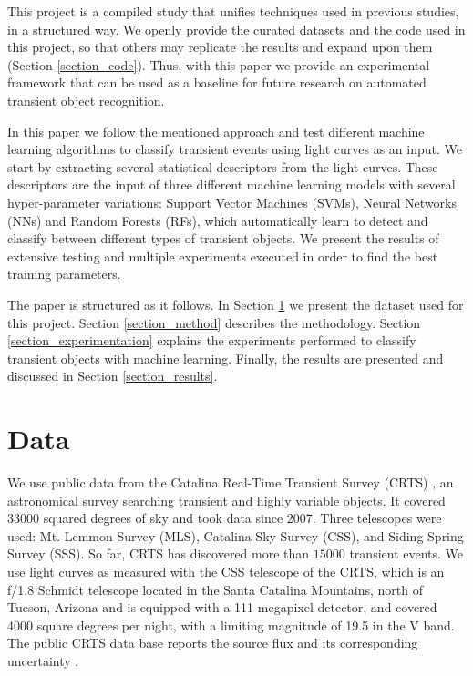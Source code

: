 \documentclass[a4paper,fleqn,usenatbib]{mnras}
\begin{document}
This project is a compiled study that unifies techniques used in previous studies, in a structured way. We openly provide the curated datasets and the code used in this project, so that others may replicate the results and expand upon them (Section \ref{section_code}). Thus, with this paper we provide an experimental framework that can be used as a baseline for future research on automated transient object recognition.

In this paper we follow the mentioned approach and test 
different machine
learning algorithms to classify transient events using light curves as an input.  
We start by extracting several statistical descriptors from the light
curves.
These descriptors are the input of three different machine learning
models with several hyper-parameter variations: Support Vector
Machines (SVMs), Neural Networks (NNs) and Random Forests (RFs), which automatically
learn to detect and classify between different types of transient
objects. 
We present the results of extensive testing and multiple experiments
executed in order to find the best training parameters. 



The paper is structured as it follows. In Section \ref{section_data}
we present the dataset used for this project. 
Section \ref{section_method} describes the methodology.
Section \ref{section_experimentation} explains the experiments
performed to classify transient objects with machine
learning. 
Finally, the results are presented and discussed in
Section \ref{section_results}.  

\section{Data} \label{section_data}

We use public data from the Catalina Real-Time Transient Survey
(CRTS) \citep{1111.2566}, an astronomical survey searching transient
and highly variable objects.   
It covered 33000 squared degrees of sky and took data since 2007.
Three telescopes were used: Mt. Lemmon Survey (MLS), Catalina Sky
Survey (CSS), and Siding Spring Survey (SSS). So far, CRTS has
discovered more than $15000$ transient events.
We use light curves as measured with the CSS telescope of the CRTS, which is
an f/1.8 Schmidt telescope located in the Santa Catalina Mountains, north of Tucson,
Arizona and is equipped with a 111-megapixel  detector, and covered
4000 square degrees per night, with a limiting magnitude of 19.5 in
the V band.  
The public CRTS data base reports the source flux and its
corresponding uncertainty \citep{1996PASP..108..851S}.
\end{document}
